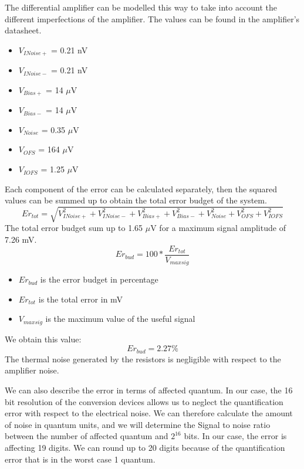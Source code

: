 \documentclass{article}[12pt]
\begin{document}
The differential amplifier can be modelled this way to take into account the different imperfections of the amplifier.
The values can be found in the amplifier's datasheet.
\begin{itemize}
    \item $V_{INoise+}$ = 0.21 nV
    \item $V_{INoise-}$ = 0.21 nV
    \item $V_{Bias+}$ = 14 $\mu$V
    \item $V_{Bias-}$ = 14 $\mu$V
    \item $V_{Noise}$ = 0.35 $\mu$V
    \item $V_{OFS}$ = 164 $\mu$V
    \item $V_{IOFS}$ = 1.25 $\mu$V
\end{itemize}
Each component of the error can be calculated separately, then the squared values can be summed up to obtain the total error budget of the system.
\begin{equation}
    Er_{tot}=\sqrt{V_{INoise+}^2 + V_{INoise-}^2 + V_{Bias+}^2 + V_{Bias-}^2 + V_{Noise}^2 + V_{OFS}^2 + V_{IOFS}^2}
\end{equation}
The total error budget sum up to 1.65 $\mu$V for a maximum signal amplitude of 7.26 mV.
\begin{equation}
    Er_{bud}=100*\dfrac{Er_{tot}}{V_{maxsig}}
\end{equation}
\begin{itemize}
    \item $Er_{bud}$ is the error budget in percentage
    \item $Er_{tot}$ is the total error in mV
    \item $V_{maxsig}$ is the maximum value of the useful signal
\end{itemize}
We obtain this value:
\begin{equation}
    Er_{bud}=2.27\%
\end{equation}
The thermal noise generated by the resistors is negligible with respect to the amplifier noise.

We can also describe the error in terms of affected quantum. In our case, the 16 bit resolution of the conversion devices allows us to neglect the quantification error with respect to the electrical noise. We can therefore calculate the amount of noise in quantum units, and we will determine the Signal to noise ratio between the number of affected quantum and $2^{16}$ bits. In our case, the error is affecting 19 digits. We can round up to 20 digits because of the quantification error that is in the worst case 1 quantum.
\end{document}
